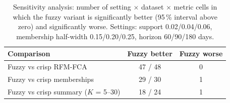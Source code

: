 \begin{table}[t]
\centering\footnotesize
\caption{Sensitivity analysis: number of setting $\times$ dataset $\times$ metric cells in which the fuzzy variant is significantly better (95\,\% interval above zero) and significantly worse. Settings: support 0.02/0.04/0.06, membership half-width 0.15/0.20/0.25, horizon 60/90/180 days.}
\label{tab:sensitivity}
\begin{tabular}{p{3.6cm}cc}
\toprule
Comparison & Fuzzy better & Fuzzy worse \\
\midrule
Fuzzy vs crisp RFM-FCA & 47 / 48 & 0 \\
Fuzzy vs crisp memberships & 29 / 30 & 1 \\
Fuzzy vs crisp summary ($K$ = 5--30) & 18 / 24 & 1 \\
\bottomrule
\end{tabular}
\end{table}
